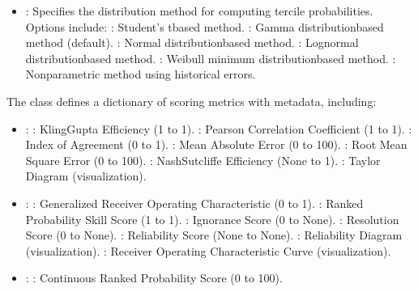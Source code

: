 \documentclass[letterpaper,10pt,english]{sphinxmanual}
\begin{document}
\sphinxAtStartPar
{}
\begin{itemize}
\item {} 
\sphinxAtStartPar
{}: Specifies the distribution method for computing tercile probabilities. Options include:
\sphinxhyphen{} : Student’s t\sphinxhyphen{}based method.
\sphinxhyphen{} : Gamma distribution\sphinxhyphen{}based method (default).
\sphinxhyphen{} : Normal distribution\sphinxhyphen{}based method.
\sphinxhyphen{} : Lognormal distribution\sphinxhyphen{}based method.
\sphinxhyphen{} : Weibull minimum distribution\sphinxhyphen{}based method.
\sphinxhyphen{} : Non\sphinxhyphen{}parametric method using historical errors.

\end{itemize}

\sphinxAtStartPar
{}

\sphinxAtStartPar
The class defines a dictionary of scoring metrics with metadata, including:
\begin{itemize}
\item {} 
\sphinxAtStartPar
{}:
\sphinxhyphen{} : Kling\sphinxhyphen{}Gupta Efficiency (\sphinxhyphen{}1 to 1).
\sphinxhyphen{} : Pearson Correlation Coefficient (\sphinxhyphen{}1 to 1).
\sphinxhyphen{} : Index of Agreement (0 to 1).
\sphinxhyphen{} : Mean Absolute Error (0 to 100).
\sphinxhyphen{} : Root Mean Square Error (0 to 100).
\sphinxhyphen{} : Nash\sphinxhyphen{}Sutcliffe Efficiency (None to 1).
\sphinxhyphen{} : Taylor Diagram (visualization).

\item {} 
\sphinxAtStartPar
{}:
\sphinxhyphen{} : Generalized Receiver Operating Characteristic (0 to 1).
\sphinxhyphen{} : Ranked Probability Skill Score (\sphinxhyphen{}1 to 1).
\sphinxhyphen{} : Ignorance Score (0 to None).
\sphinxhyphen{} : Resolution Score (0 to None).
\sphinxhyphen{} : Reliability Score (None to None).
\sphinxhyphen{} : Reliability Diagram (visualization).
\sphinxhyphen{} : Receiver Operating Characteristic Curve (visualization).

\item {} 
\sphinxAtStartPar
{}:
\sphinxhyphen{} : Continuous Ranked Probability Score (0 to 100).

\end{itemize}
\end{document}
